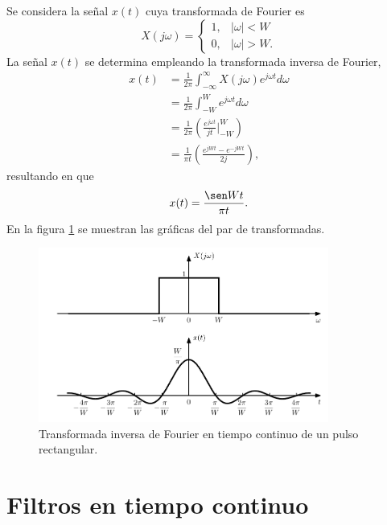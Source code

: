 \documentclass[a4paper]{report}
\begin{document}
Se considera la señal \(x(t)\) cuya transformada de Fourier es
\[
 X(j\omega)=
 \left\{ 
 \begin{array}{ll}
  1, & |\omega|< W\\
  0, & |\omega|>W.
 \end{array} 
 \right.
\]
La señal \(x(t)\) se determina empleando la transformada inversa de Fourier,
\begin{align*}
 x(t)&=\frac{1}{2\pi}\int_{-\infty}^{\infty}X(j\omega)e^{j\omega t}d\omega\\
  &=\frac{1}{2\pi}\int_{-W}^{W}e^{j\omega t}d\omega\\
  &=\frac{1}{2\pi}\left(\frac{e^{j\omega t}}{jt}\bigg|_{-W}^{W}\right)\\
  &=\frac{1}{\pi t}\left(\frac{e^{jW t}-e^{-jW t}}{2j}\right),
\end{align*}
resultando en que
\begin{equation}\label{eq:continous_inverse_fourier_transform_rectangular_pulse}
  x(t)=\frac{\sen Wt}{\pi t}.
\end{equation}
En la figura \ref{fig:sampling_lowpass_continuous_inverse_fourier_transform_1} se muestran las gráficas del par de transformadas.
\begin{figure}[!htb]
 \begin{center}
 \includegraphics[width=0.85\textwidth]{figuras/sampling_lowpass_continuous_inverse_fourier_transform_1.pdf}
 \caption{\label{fig:sampling_lowpass_continuous_inverse_fourier_transform_1} Transformada inversa de Fourier en tiempo continuo de un pulso rectangular.}
 \end{center}
\end{figure}


\chapter{Filtros en tiempo continuo}\label{ap:continous_time_filters}
\end{document}
